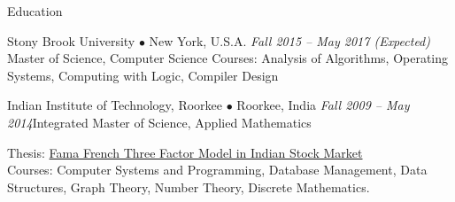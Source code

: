 \documentclass{resume} %
\begin{document}

\begin{rSection}{Education}

\begin{rSubsection}
{Stony Brook University $\bullet$ New York, U.S.A.} {\emph{Fall 2015 -- May 2017 (Expected)} }
{Master of Science, Computer Science } {} 
Courses: Analysis of Algorithms, Operating Systems, Computing with Logic, Compiler Design
\end{rSubsection}

\begin{rSubsection}
{Indian Institute of Technology, Roorkee $\bullet$ Roorkee, India} {\emph{Fall 2009 -- May 2014}}{Integrated Master of Science, Applied Mathematics} {} 
\item[] 
{{Thesis: \href{http://sci-edit.net/journal/index.php/cgt/article/download/40/35}{Fama French Three Factor Model in Indian Stock Market} }}  \\
Courses: Computer Systems and Programming, Database Management, Data Structures, Graph Theory, Number Theory, Discrete Mathematics.

\end{rSubsection}

\end{rSection}





\end{document}
